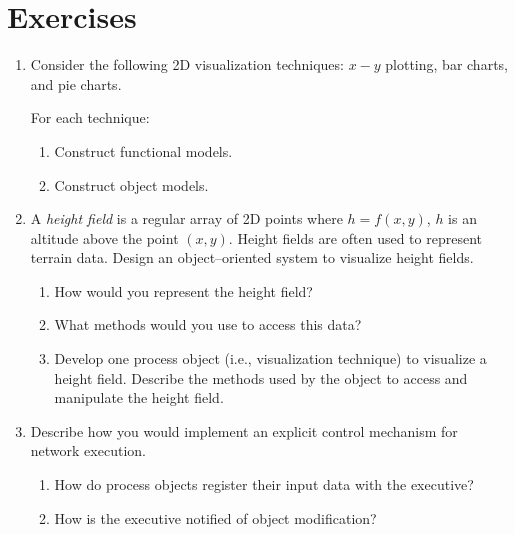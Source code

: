 \printbibliography

\section{Exercises}
\begin{enumerate}

\item Consider the following 2D visualization techniques: $x-y$ plotting, bar charts, and pie charts.

For each technique:

\begin{enumerate}

    \item Construct functional models.

    \item Construct object models.

\end{enumerate}

    \item \label{ex:ch04_4.2} A \emph{height field} is a regular array of 2D points where $h = f(x,y)$, $h$ is an altitude above the point $(x,y)$. Height fields are often used to represent terrain data. Design an object--oriented system to visualize height fields.

\begin{enumerate}

    \item How would you represent the height field?

    \item What methods would you use to access this data?

    \item Develop one process object (i.e., visualization technique) to visualize a height field. Describe the methods used by the object to access and manipulate the height field.

\end{enumerate}

\item Describe how you would implement an explicit control mechanism for network execution.

\begin{enumerate}

    \item How do process objects register their input data with the executive?

    \item How is the executive notified of object modification?


\end{enumerate}
\end{enumerate}
